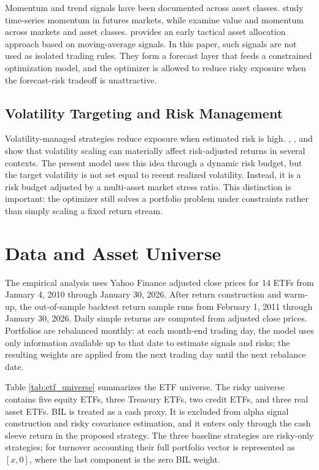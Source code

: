 \documentclass[11pt]{article}
\begin{document}
Momentum and trend signals have been documented across asset classes.
\citet{moskowitz2012} study time-series momentum in futures markets, while
\citet{asness2013} examine value and momentum across markets and asset classes.
\citet{faber2007} provides an early tactical asset allocation approach based on
moving-average signals. In this paper, such signals are not used as isolated trading
rules. They form a forecast layer that feeds a constrained optimization model, and
the optimizer is allowed to reduce risky exposure when the forecast-risk tradeoff is
unattractive.

\subsection{Volatility Targeting and Risk Management}

Volatility-managed strategies reduce exposure when estimated risk is high.
\citet{moreira2017}, \citet{barroso2015}, and \citet{harvey2018} show that volatility
scaling can materially affect risk-adjusted returns in several contexts. The present
model uses this idea through a dynamic risk budget, but the target volatility is not
set equal to recent realized volatility. Instead, it is a risk budget adjusted by a
multi-asset market stress ratio. This distinction is important: the optimizer still
solves a portfolio problem under constraints rather than simply scaling a fixed
return stream.

\section{Data and Asset Universe}
\label{sec:data}

The empirical analysis uses Yahoo Finance adjusted close prices for 14 ETFs from
January 4, 2010 through January 30, 2026. After return construction and warm-up, the
out-of-sample backtest return sample runs from February 1, 2011 through January 30,
2026. Daily simple returns are computed from adjusted close prices. Portfolios are
rebalanced monthly: at each month-end trading day, the model uses only information
available up to that date to estimate signals and risks; the resulting weights are
applied from the next trading day until the next rebalance date.

\ETFUniverseTable

Table \ref{tab:etf_universe} summarizes the ETF universe. The risky universe contains
five equity ETFs, three Treasury ETFs, two credit ETFs, and three real asset ETFs.
BIL is treated as a cash proxy. It is excluded from alpha signal construction and
risky covariance estimation, and it enters only through the cash sleeve return in
the proposed strategy. The three baseline strategies are risky-only strategies; for
turnover accounting their full portfolio vector is represented as \([x,0]\), where
the last component is the zero BIL weight.
\end{document}
